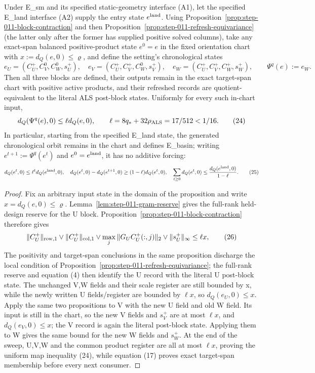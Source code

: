 \begin{proposition}\label{prop:step-011-chronological-contraction}
Under E\_sm and its specified static-geometry interface (A1), let the specified E\_land interface (A2) supply
the entry state \(e^{\rm land}\). Using
Proposition~\ref{prop:step-011-block-contraction} and then
Proposition~\ref{prop:step-011-refresh-equivariance} (the latter only after
the former has supplied positive solved columns), take any exact-span
balanced positive-product state \(e^0=e\) in the fixed orientation chart
with \(x:=d_Q(e,0)\le\varrho\), and define the setting's chronological states
\[
 e_U=(C_U^+,C_V^0,C_W^0,s_U^+),\quad
 e_V=(C_U^+,C_V^+,C_W^0,s_V^+),\quad
 e_W=(C_U^+,C_V^+,C_W^+,s_W^+),
 \qquad \Psi^q(e):=e_W.
\tag{23}
\]
Then all three blocks are defined, their outputs remain in the exact
target-span chart with positive active products, and their refreshed records
are quotient-equivalent to the literal ALS post-block states. Uniformly for
every such in-chart input,
\[
 d_Q(\Psi^q(e),0)\le\ell d_Q(e,0),
 \qquad \ell=8q_*+32\rho_{\rm ALS}=17/512<1/16.
\tag{24}
\]
In particular, starting from the specified E\_land state, the generated
chronological orbit remains in the chart and defines E\_basin; writing
\(e^{t+1}:=\Psi^q(e^t)\) and \(e^0=e^{\rm land}\), it has no additive forcing:
\[
 d_Q(e^t,0)\le\ell^t d_Q(e^{\rm land},0),
 \quad
 d_Q(e^t,0)-d_Q(e^{t+1},0)\ge(1-\ell)d_Q(e^t,0),
 \quad
 \sum_{t\ge0}d_Q(e^t,0)\le{d_Q(e^{\rm land},0)\over1-\ell}.
\tag{25}
\]

\begin{proof}
Fix an arbitrary input state in the domain of the
proposition and write \(x=d_Q(e,0)\le\varrho\). Lemma~\ref{lem:step-011-gram-reserve}
gives the full-rank held-design reserve for the U block. Proposition~\ref{prop:step-011-block-contraction}
therefore gives
\[
  \|C_U^+\|_{\rm row,1}\vee\|C_U^+\|_{\rm col,1}
  \vee\max_j\|G_UC_U^+(:,j)\|_2\vee\|s_U^+\|_\infty
  \le\ell x,
\tag{26}
\]
The positivity and target-span conclusions in the same proposition discharge
the local condition of Proposition~\ref{prop:step-011-refresh-equivariance};
the full-rank reserve and equation (4) then identify the U record with the
literal U post-block state. The unchanged V,W fields and their scale register
are still bounded by x, while the newly written U fields/register are bounded
by \(\ell x\), so \(d_Q(e_U,0)\le x\). Apply
the same two propositions to V with the new U field and old W field. Its input
is still in the chart, so the new V fields and \(s_V^+\) are at most
\(\ell x\), and \(d_Q(e_V,0)\le x\); the V record is again the literal
post-block state. Applying them to W gives the same bound for the new W
fields and \(s_W^+\). At the end of the sweep, U,V,W and the common product
register are all at most \(\ell x\), proving the uniform map inequality
(24), while equation (17) proves exact target-span membership before every
next consumer.


\end{proof}
\end{proposition}
